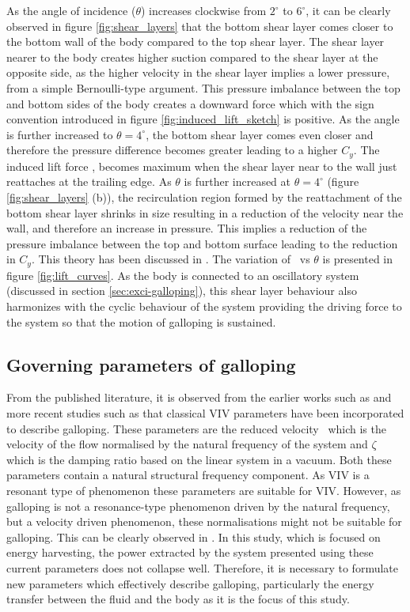 As the angle of incidence ($\theta$) increases clockwise from $2^{\circ}$ to $6^{\circ}$, it can be clearly observed in figure \ref{fig:shear_layers} that the bottom shear layer comes closer to the bottom wall of the body compared to the top shear layer. The shear layer nearer to the body creates higher suction compared to the shear layer at the opposite side, as the higher velocity in the shear layer implies a lower pressure, from a simple Bernoulli-type argument. This pressure imbalance between the top and bottom sides of the body creates a downward force which with the sign convention introduced in figure \ref{fig:induced_lift_sketch} is positive. As the angle is further increased to $\theta=4^{\circ}$, the bottom shear layer comes even closer and therefore the pressure difference becomes greater leading to a higher $C_{y}$. The induced lift force \cy, becomes maximum when the shear layer near to the wall just reattaches at the trailing edge. As $\theta$ is further increased at  $\theta=4^{\circ}$ (figure \ref{fig:shear_layers} (b)), the recirculation region formed by the reattachment of the bottom shear layer shrinks in size resulting in a reduction of the velocity near the wall, and therefore an increase in pressure. This implies a reduction of the pressure imbalance between the top and bottom surface leading to the reduction in $C_{y}$. This theory has been discussed in \citet{Parkinson1989}. The variation of \cy\ vs $\theta$ is presented in figure \ref{fig:lift_curves}. As the body is connected to an oscillatory system (discussed in section \ref{sec:exci-galloping}), this shear layer behaviour also harmonizes with the cyclic behaviour of the system providing the driving force to the system so that the motion of galloping is sustained.

\subsection{Governing parameters of galloping}

From the published literature, it is observed from the earlier works such as \citet{Parkinson1961,Luo1994} and more recent studies such as \citet{Luo2003,Barrero-Gil2010a,Joly2012} that classical VIV parameters have been incorporated to describe galloping. These parameters are the reduced velocity \ustar\ which is the velocity of the flow normalised by the natural frequency of the system and $\zeta$ which is the damping ratio based on the linear system in a vacuum. Both these parameters contain a natural structural frequency component. As VIV is a resonant type of phenomenon these parameters are suitable for VIV. However, as galloping is not a resonance-type phenomenon driven by the natural frequency, but a velocity driven phenomenon, these normalisations might not be suitable for galloping. This can be clearly observed in \citet{Barrero-Gil2010a}. In this study, which is focused on energy harvesting, the power extracted by the system presented using these current parameters does not collapse well. Therefore, it is necessary to formulate new parameters which effectively describe galloping, particularly the energy transfer between the fluid and the body as it is the focus of this study.     


